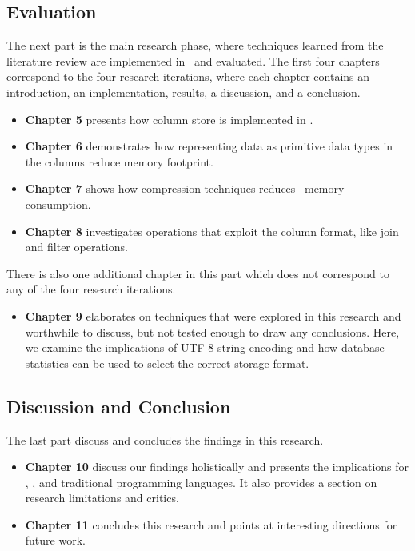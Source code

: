 \subsection{Evaluation}
\label{sub:Evaluation}
The next part is the main research phase, where techniques learned from the literature review are implemented in \gap~and evaluated. The first four chapters correspond to the four research iterations, where each chapter contains an introduction, an implementation, results, a discussion, and a conclusion.
\begin{itemize}
    \item \textbf{Chapter 5} presents how column store is implemented in \gap.
    \item \textbf{Chapter 6} demonstrates how representing data as primitive data types in the columns reduce memory footprint.
    \item \textbf{Chapter 7} shows how compression techniques reduces \gap~memory consumption.
    \item \textbf{Chapter 8} investigates operations that exploit the column format, like join and filter operations.
\end{itemize}

There is also one additional chapter in this part which does not correspond to any of the four research iterations.

\begin{itemize}
    \item \textbf{Chapter 9} elaborates on techniques that were explored in this research and worthwhile to discuss, but not tested enough to draw any conclusions. Here, we examine the implications of UTF-8 string encoding and how database statistics can be used to select the correct storage format.
\end{itemize}

\subsection{Discussion and Conclusion}
\label{sub:Discussion and Conclusion}
The last part discuss and concludes the findings in this research.
\begin{itemize}
    \item \textbf{Chapter 10} discuss our findings holistically and presents the implications for \gap, \mde, and traditional programming languages. It also provides a section on research limitations and critics.
    \item \textbf{Chapter 11} concludes this research and points at interesting directions for future work.
\end{itemize}



